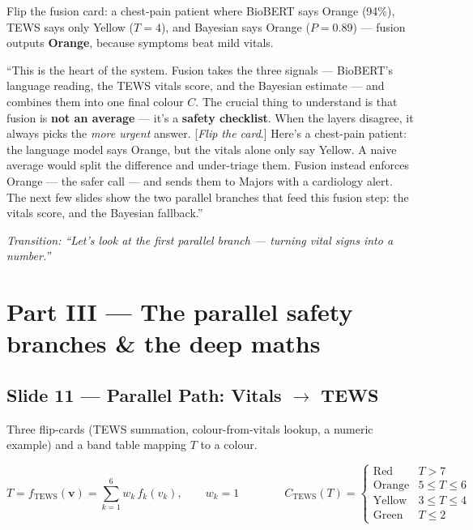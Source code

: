 \documentclass[11pt]{article}
\newcommand{\chip}[2]{\textcolor{#1}{\textbf{#2}}}
\newcommand{\transition}[1]{\medskip\noindent\textit{\textcolor{mutel}{Transition: #1}}\medskip}
\newcommand{\route}[1]{{\small\texttt{\textcolor{mutel}{#1}}}}
\newcommand{\slide}[3]{%
  \subsection{Slide #1 --- #2}%
  \noindent\route{Route: #3}\par\smallskip}
\begin{document}
\begin{demo}
Flip the fusion card: a chest-pain patient where BioBERT says Orange (94\%), TEWS says only Yellow ($T=4$),
and Bayesian says Orange ($P=0.89$) --- fusion outputs \chip{satOrange}{Orange}, because symptoms beat
mild vitals.
\end{demo}

\begin{saybox}
``This is the heart of the system. Fusion takes the three signals --- BioBERT's language reading, the
TEWS vitals score, and the Bayesian estimate --- and combines them into one final colour $C$. The crucial
thing to understand is that fusion is \textbf{not an average} --- it's a \textbf{safety checklist}. When
the layers disagree, it always picks the \emph{more urgent} answer. [\emph{Flip the card}.] Here's a
chest-pain patient: the language model says Orange, but the vitals alone only say Yellow. A naive average
would split the difference and under-triage them. Fusion instead enforces Orange --- the safer call ---
and sends them to Majors with a cardiology alert. The next few slides show the two parallel branches that
feed this fusion step: the vitals score, and the Bayesian fallback.''
\end{saybox}

\transition{``Let's look at the first parallel branch --- turning vital signs into a number.''}

\section{Part III --- The parallel safety branches \& the deep maths}

\slide{11}{Parallel Path: Vitals $\rightarrow$ TEWS}{/dashboard/pipeline/tews}

\begin{onscreen}
Three flip-cards (TEWS summation, colour-from-vitals lookup, a numeric example) and a band table mapping
$T$ to a colour.
\end{onscreen}

\[
T = f_{\mathrm{TEWS}}(\mathbf{v}) = \sum_{k=1}^{6} w_k\, f_k(v_k),\qquad w_k = 1
\qquad\qquad
C_{\mathrm{TEWS}}(T)=\begin{cases}
\text{Red} & T>7\\ \text{Orange} & 5\le T\le 6\\ \text{Yellow} & 3\le T\le 4\\ \text{Green} & T\le 2
\end{cases}
\]
\end{document}

